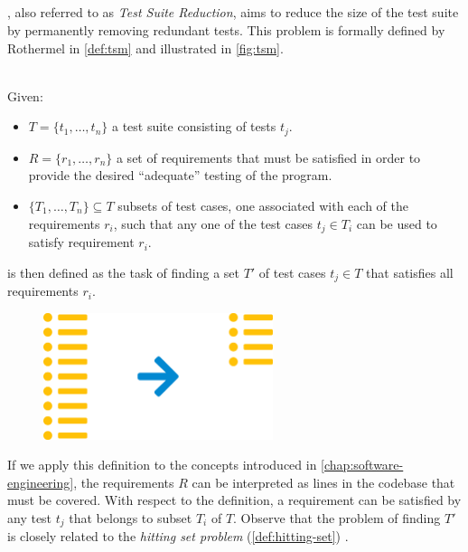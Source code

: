 
\subsection{\tsm{}}
\label{ssec:tsm}
\tsm{}, also referred to as \emph{Test Suite Reduction}, aims to reduce the size of the test suite by permanently removing redundant tests. This problem is formally defined by Rothermel in \autoref{def:tsm} \cite{10.1002/stv.430} and illustrated in \autoref{fig:tsm}. 

\begin{definition}[\tsm{}]
\label{def:tsm}
\mbox{}\\Given:
\begin{itemize}
	\item $T = \{t_1, \dots, t_n\}$ a test suite consisting of tests $t_j$.
	\item $R = \{r_1, \dots, r_n\}$ a set of requirements that must be satisfied in order to provide the desired ``adequate'' testing of the program.
	\item $\{T_1, \dots, T_n\} \subseteq T$ subsets of test cases, one associated with each of the requirements $r_i$, such that any one of the test cases $t_j \in T_i$ can be used to satisfy requirement $r_i$.
\end{itemize}

\noindent \tsm{} is then defined as the task of finding a set $T'$ of test cases $t_j \in T$ that satisfies all requirements $r_i$.
\end{definition}


\begin{figure}[htbp!]
	\centering
	\includegraphics[width=0.6\textwidth]{assets/approach-tsm.pdf}
	\caption{\tsm{}}
	\label{fig:tsm}
\end{figure}

\noindent If we apply this definition to the concepts introduced in \autoref{chap:software-engineering}, the requirements $R$ can be interpreted as lines in the codebase that must be covered. With respect to the definition, a requirement can be satisfied by any test $t_j$ that belongs to subset $T_i$ of $T$. Observe that the problem of finding $T'$ is closely related to the \emph{hitting set problem} (\autoref{def:hitting-set}) \cite{10.1002/stv.430}.


